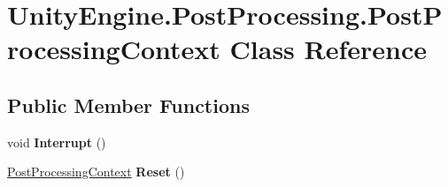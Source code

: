 \hypertarget{class_unity_engine_1_1_post_processing_1_1_post_processing_context}{}\section{Unity\+Engine.\+Post\+Processing.\+Post\+Processing\+Context Class Reference}
\label{class_unity_engine_1_1_post_processing_1_1_post_processing_context}
\subsection*{Public Member Functions}
\begin{DoxyCompactItemize}
\item 
\mbox{\label{class_unity_engine_1_1_post_processing_1_1_post_processing_context_a5576527ed48192d867c94726398fd83f}} 
void {\bfseries Interrupt} ()
\item 
\mbox{\label{class_unity_engine_1_1_post_processing_1_1_post_processing_context_ab29cec74ac7c25ed7793d1d4fcb82271}} 
\hyperlink{class_unity_engine_1_1_post_processing_1_1_post_processing_context}{Post\+Processing\+Context} {\bfseries Reset} ()
\end{DoxyCompactItemize}
